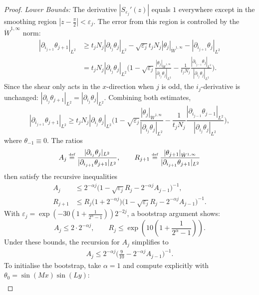 \documentclass[12pt]{report}   %
\newcommand{\defeq}{\stackrel{\scriptscriptstyle\textup{def}}{=}}
\renewcommand{\le}{\leqslant}
\renewcommand{\ge}{\geqslant}
\numberwithin{equation}{section}
\theoremstyle{plain}
\theoremstyle{definition}
\theoremstyle{remark}
\newcommand{\eps}{{\varepsilon}}
\begin{document}
\begin{proof}
\emph{Lower Bounds:}
The derivative $|S_{\eps_j}'(z)|$ equals $1$ everywhere except in the smoothing region $|z-\frac{\pi}{2}|<\eps_j$. The error from this region is controlled by the $\dot{W}^{1,\infty}$ norm:
\begin{align*}
|\partial_{i_{j+1}} \theta_{j+1}|_{L^2}&\ge t_j N_j |\partial_{i_j}\theta_j|_{L^2}-\sqrt{\eps_j} t_j N_j|\theta _j|_{\dot{W}^{1,\infty}} - |\partial_{i_{j+1}} \theta_j|_{L^2}\\
&=t_j N_j|\partial_{i_j}\theta_j|_{L^2}\Big(1-\sqrt{\eps_j} \frac{|\theta _j|_{\dot{W}^{1,\infty}}}{|\partial_{i_j}\theta_j|_{L^2}}- {\frac{1}{t_jN_j}} \frac{|\partial_{i_{j-1}}\theta_{j}|_{L^2}}{|\partial_{i_j}\theta_j|_{L^2}}\Big).
\end{align*}
Since the shear only acts in the $x$-direction when $j$ is odd, the $i_j$-derivative is unchanged: $|\partial_{i_j}\theta_{j+1}|_{L^2}= |\partial_{i_j}\theta_j|_{L^2}$. Combining both estimates,
 \[|\partial_{i_{j+1}} \theta_{j+1}|_{L^2}\ge t_j N_j|\partial_{i_j}\theta_j|_{L^2}\Big(1-\sqrt{\eps_j} \frac{|\theta _j|_{\dot{W}^{1,\infty}}}{|\partial_{i_j}\theta_j|_{L^2}}- {\frac{1}{t_jN_j}}\frac{|\partial_{i_{j-1}}\theta_{j-1}|_{L^2}}{|\partial_{i_j}\theta_j|_{L^2}}\Big),\]
where $\theta_{-1}\equiv 0$. The ratios
\[A_j\defeq \frac{|\partial_{i_{j}} \theta_{j}|_{L^2}}{|\partial_{i_{j+1}}\theta_{j+1}|_{L^2}}, \qquad R_{{j+1}}\defeq\frac{|\theta _{j+1}|_{\dot W^{1,\infty}}}{|\partial_{i_{j+1}}\theta_{j+1}|_{L^2}}\]
then satisfy the recursive inequalities
\begin{align*}
A_{j}&\le 2^{-{\alpha}j} \Big(1-\sqrt{\eps_j} R_j-2^{-{\alpha}j}A_{j-1}\Big)^{-1}, \\
R_{j+1}&\le R_j\Big(1+2^{-{\alpha}j}\Big)\Big(1- {\sqrt{\eps_j}}  R_j-2^{-{\alpha}j}A_{j-1})^{-1}.
\end{align*}
With $\eps_j={\exp(-30(1 + \frac{1}{2^\alpha-1}))}2^{-2j}$, a bootstrap argument shows:
\[A_{j}\le 2\cdot 2^{-{\alpha}j}, \qquad R_j\le {\exp(10(1 + \frac{1}{2^\alpha-1}))}.\]
Under these bounds, the recursion for $A_j$ simplifies to
\begin{equation}\label{eq:ineq}
\begin{split}
 A_j\le 2^{-{\alpha}j}\Big(\frac{9}{10}-2^{-{\alpha}j}A_{j-1}\Big)^{-1}.
\end{split}
\end{equation}
To initialise the bootstrap, take $\alpha = 1$ and compute explicitly with $\theta_0 = \sin(Mx)\sin(Ly)$:
\begin{equation*}
	\begin{split}

\end{split}
\end{equation*}
\end{proof}
\end{document}
